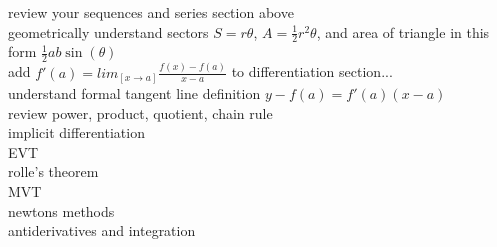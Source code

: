 \documentclass{article}
\begin{document}
review your sequences and series section above\^\\

geometrically understand sectors $S = r\theta$, $A = \frac{1}{2}r^2\theta$, and area of triangle in this form $\frac{1}{2}ab\sin(\theta)$\\ 

add $f'(a) = lim_[x \to a]\frac{f(x) - f(a)}{x - a}$ to differentiation section...\\
understand formal tangent line definition $y - f(a) = f'(a)(x - a)$\\
review power, product, quotient, chain rule\\
implicit differentiation\\
EVT\\
rolle's theorem\\
MVT\\
newtons methods\\

antiderivatives and integration\\
\end{document}

